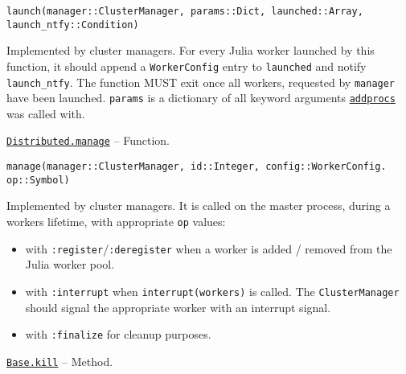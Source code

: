 \begin{adjustwidth}{2em}{0pt}


\begin{verbatim}
launch(manager::ClusterManager, params::Dict, launched::Array, launch_ntfy::Condition)
\end{verbatim}

Implemented by cluster managers. For every Julia worker launched by this function, it should append a \texttt{WorkerConfig} entry to \texttt{launched} and notify \texttt{launch\_ntfy}. The function MUST exit once all workers, requested by \texttt{manager} have been launched. \texttt{params} is a dictionary of all keyword arguments \hyperlink{2657399037748470653}{\texttt{addprocs}} was called with.



\end{adjustwidth}
\hypertarget{8462349151012734144}{}
\hyperlink{8462349151012734144}{\texttt{Distributed.manage}}  -- {Function.}

\begin{adjustwidth}{2em}{0pt}


\begin{verbatim}
manage(manager::ClusterManager, id::Integer, config::WorkerConfig. op::Symbol)
\end{verbatim}

Implemented by cluster managers. It is called on the master process, during a worker{\textquotesingle}s lifetime, with appropriate \texttt{op} values:

\begin{itemize}
\item with \texttt{:register}/\texttt{:deregister} when a worker is added / removed from the Julia worker pool.


\item with \texttt{:interrupt} when \texttt{interrupt(workers)} is called. The \texttt{ClusterManager} should signal the appropriate worker with an interrupt signal.


\item with \texttt{:finalize} for cleanup purposes.

\end{itemize}


\end{adjustwidth}
\hypertarget{17231418107878502701}{}
\hyperlink{17231418107878502701}{\texttt{Base.kill}}  -- {Method.}

